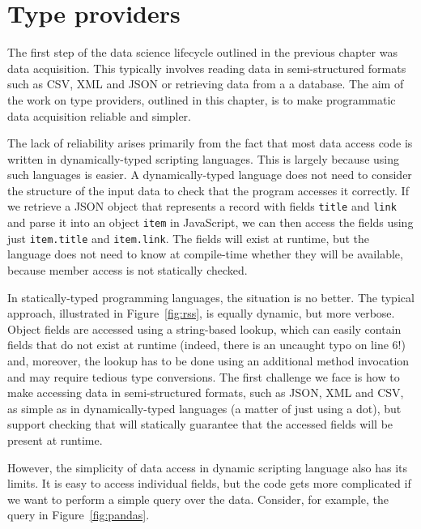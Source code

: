 \documentclass[fleqn,11pt]{report}
\theoremstyle{definition}
\begin{document}

\chapter{Type providers}
\label{ch:tp}

The first step of the data science lifecycle outlined in the previous chapter was data acquisition.
This typically involves reading data in semi-structured formats such as CSV, XML and JSON or
retrieving data from a a database. The aim of the work on type providers, outlined in this chapter,
is to make programmatic data acquisition reliable and simpler.

The lack of reliability arises primarily from the fact that most data access code is written in
dynamically-typed scripting languages. This is largely because using such languages is easier.
A dynamically-typed language does not need to consider the structure of the input data to
check that the program accesses it correctly. If we retrieve a JSON object that represents a record
with fields \texttt{title} and \texttt{link} and parse it into an object \texttt{item} in
JavaScript, we can then access the fields using just \texttt{item.title} and \texttt{item.link}.
The fields will exist at runtime, but the language does not need to know at compile-time whether
they will be  available, because member access is not statically checked.

In statically-typed programming languages, the situation is no better. The typical approach, illustrated
in Figure~\ref{fig:rss}, is equally dynamic, but more verbose. Object fields are accessed using
a string-based lookup, which can easily contain fields that do not exist at runtime (indeed, there
is an uncaught typo on line 6!) and, moreover, the lookup has to be done using an additional method
invocation and may require tedious type conversions. The first challenge we face is how to
make accessing data in semi-structured formats, such as JSON, XML and CSV, as simple as in
dynamically-typed languages (a matter of just using a dot), but support checking that will
statically guarantee that the accessed fields will be present at runtime.

However, the simplicity of data access in dynamic scripting language also has its limits. It is easy to
access individual fields, but the code gets more complicated if we want to perform a simple
query over the data. Consider, for example, the query in Figure~\ref{fig:pandas}.
\end{document}
